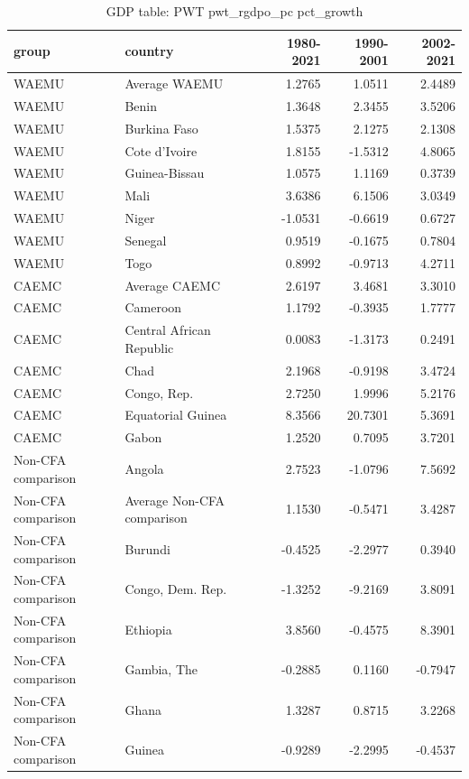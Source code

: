 \begin{table}

\caption{GDP table: PWT pwt_rgdpo_pc pct_growth}
\centering
\begin{tabular}[t]{llrrr}
\toprule
group & country & 1980-2021 & 1990-2001 & 2002-2021\\
\midrule
WAEMU & Average WAEMU & 1.2765 & 1.0511 & 2.4489\\
WAEMU & Benin & 1.3648 & 2.3455 & 3.5206\\
WAEMU & Burkina Faso & 1.5375 & 2.1275 & 2.1308\\
WAEMU & Cote d'Ivoire & 1.8155 & -1.5312 & 4.8065\\
WAEMU & Guinea-Bissau & 1.0575 & 1.1169 & 0.3739\\
\addlinespace
WAEMU & Mali & 3.6386 & 6.1506 & 3.0349\\
WAEMU & Niger & -1.0531 & -0.6619 & 0.6727\\
WAEMU & Senegal & 0.9519 & -0.1675 & 0.7804\\
WAEMU & Togo & 0.8992 & -0.9713 & 4.2711\\
CAEMC & Average CAEMC & 2.6197 & 3.4681 & 3.3010\\
\addlinespace
CAEMC & Cameroon & 1.1792 & -0.3935 & 1.7777\\
CAEMC & Central African Republic & 0.0083 & -1.3173 & 0.2491\\
CAEMC & Chad & 2.1968 & -0.9198 & 3.4724\\
CAEMC & Congo, Rep. & 2.7250 & 1.9996 & 5.2176\\
CAEMC & Equatorial Guinea & 8.3566 & 20.7301 & 5.3691\\
\addlinespace
CAEMC & Gabon & 1.2520 & 0.7095 & 3.7201\\
Non-CFA comparison & Angola & 2.7523 & -1.0796 & 7.5692\\
Non-CFA comparison & Average Non-CFA comparison & 1.1530 & -0.5471 & 3.4287\\
Non-CFA comparison & Burundi & -0.4525 & -2.2977 & 0.3940\\
Non-CFA comparison & Congo, Dem. Rep. & -1.3252 & -9.2169 & 3.8091\\
\addlinespace
Non-CFA comparison & Ethiopia & 3.8560 & -0.4575 & 8.3901\\
Non-CFA comparison & Gambia, The & -0.2885 & 0.1160 & -0.7947\\
Non-CFA comparison & Ghana & 1.3287 & 0.8715 & 3.2268\\
Non-CFA comparison & Guinea & -0.9289 & -2.2995 & -0.4537\\

\end{tabular}
\end{table}
